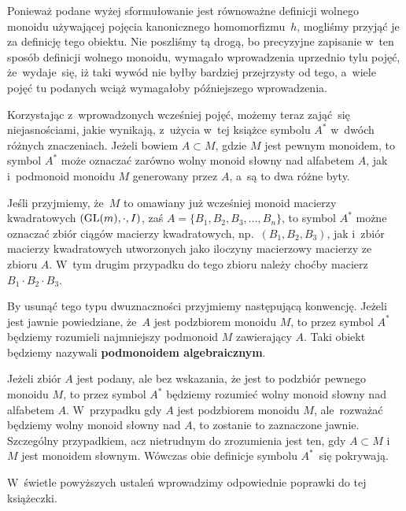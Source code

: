 \documentclass[a4paper,11pt]{article}
\begin{document}
Ponieważ podane wyżej sformułowanie jest równoważne definicji wolnego
monoidu używającej pojęcia kanonicznego homomorfizmu~$h$, mogliśmy
przyjąć je za definicję tego obiektu. Nie poszliśmy tą drogą, bo
precyzyjne zapisanie w~ten sposób definicji wolnego monoidu, wymagało
wprowadzenia uprzednio tylu pojęć, że~wydaje~się, iż taki wywód nie
byłby bardziej przejrzysty od tego, a~wiele pojęć tu podanych wciąż
wymagałoby późniejszego wprowadzenia.

\vspace{\spaceFour}





\start {} Korzystając z~wprowadzonych wcześniej pojęć, możemy
teraz zająć~się niejasnościami, jakie wynikają, z~użycia w~tej książce
symbolu $A^{ * }$ w~dwóch różnych znaczeniach. Jeżeli bowiem
$A \subset M$, gdzie $M$ jest pewnym monoidem, to symbol $A^{ * }$
może oznaczać zarówno wolny monoid słowny nad alfabetem $A$, jak
i~podmonoid monoidu $M$ generowany przez $A$, a~są to dwa różne byty.

Jeśli przyjmiemy, że~$M$ to omawiany już wcześniej monoid macierzy
kwadratowych $( \mathrm{GL}( m ), \cdot, I )$, zaś
$A = \{ B_{ 1 }, B_{ 2 }, B_{ 3 }, \ldots, B_{ n } \}$, to symbol
$A^{ * }$ możne oznaczać zbiór ciągów macierzy kwadratowych,
np.~$( B_{ 1 }, B_{ 2 }, B_{ 3 } )$, jak i~zbiór macierzy kwadratowych
utworzonych jako iloczyny macierzowy macierzy ze zbioru $A$. W~tym
drugim przypadku do tego zbioru należy choćby macierz
$B_{ 1 } \cdot B_{ 2 } \cdot B_{ 3 }$.

By usunąć tego typu dwuznaczności przyjmiemy następującą konwencję.
Jeżeli jest jawnie powiedziane, że~$A$ jest podzbiorem monoidu $M$, to
przez symbol $A^{ * }$ będziemy rozumieli najmniejszy podmonoid $M$
zawierający $A$. Taki obiekt będziemy nazywali \textbf{podmonoidem
  algebraicznym}.

Jeżeli zbiór $A$ jest podany, ale bez wskazania, że jest to podzbiór
pewnego monoidu $M$, to przez symbol $A^{ * }$ będziemy rozumieć wolny
monoid słowny nad alfabetem $A$. W~przypadku gdy $A$ jest podzbiorem
monoidu $M$, ale~rozważać będziemy wolny monoid słowny nad $A$, to
zostanie to zaznaczone jawnie. Szczególny przypadkiem, acz nietrudnym
do zrozumienia jest ten, gdy $A \subset M$ i~$M$ jest monoidem
słownym. Wówczas obie definicje symbolu $A^{ * }$~się pokrywają.

W~świetle powyższych ustaleń wprowadzimy odpowiednie poprawki do tej
książeczki.
\end{document}

